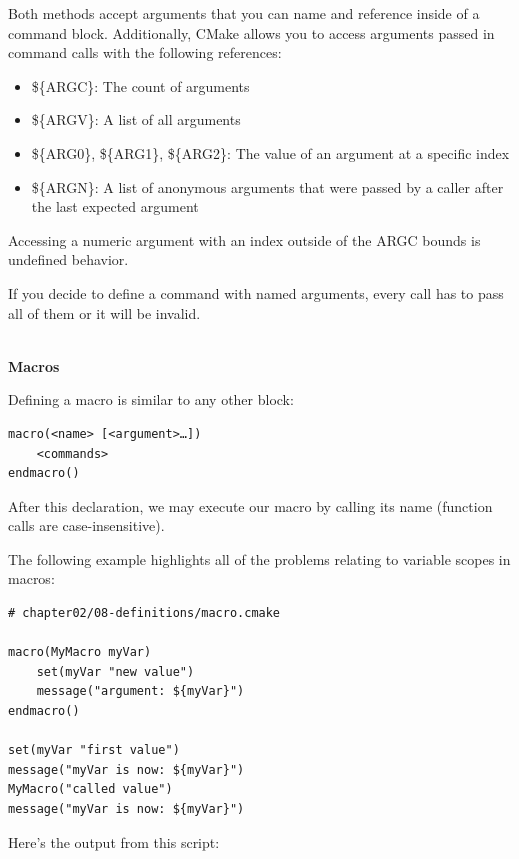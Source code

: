 Both methods accept arguments that you can name and reference inside of a command block. Additionally, CMake allows you to access arguments passed in command calls with the following references:

\begin{itemize}
\item 
\$\{ARGC\}: The count of arguments

\item 
\$\{ARGV\}: A list of all arguments

\item 
\$\{ARG0\}, \$\{ARG1\}, \$\{ARG2\}: The value of an argument at a specific index

\item 
\$\{ARGN\}: A list of anonymous arguments that were passed by a caller after the last expected argument
\end{itemize}

Accessing a numeric argument with an index outside of the ARGC bounds is undefined behavior.

If you decide to define a command with named arguments, every call has to pass all of them or it will be invalid.

\hspace*{\fill} \\ %
\noindent
\textbf{Macros}

Defining a macro is similar to any other block:

\begin{lstlisting}[style=styleCMake]
macro(<name> [<argument>…])
	<commands>
endmacro()
\end{lstlisting}

After this declaration, we may execute our macro by calling its name (function calls are case-insensitive).

The following example highlights all of the problems relating to variable scopes in macros:

\begin{lstlisting}[style=styleCMake]
# chapter02/08-definitions/macro.cmake

macro(MyMacro myVar)
	set(myVar "new value")
	message("argument: ${myVar}")
endmacro()

set(myVar "first value")
message("myVar is now: ${myVar}")
MyMacro("called value")
message("myVar is now: ${myVar}")
\end{lstlisting}

Here's the output from this script:



